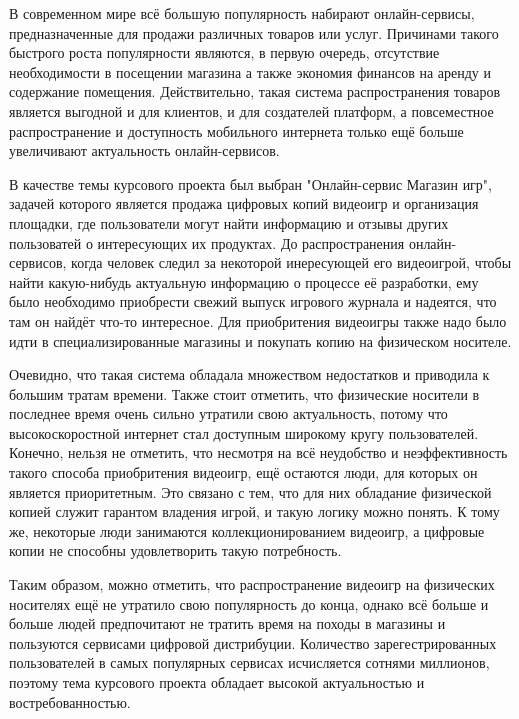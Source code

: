 \label{sec:introduction}

В современном мире всё большую популярность набирают онлайн-сервисы, предназначенные для продажи различных товаров или услуг.
Причинами такого быстрого роста популярности являются, в первую очередь, отсутствие необходимости в посещении магазина а также
экономия финансов на аренду и содержание помещения. Действительно, такая система распространения товаров является выгодной и для клиентов,
и для создателей платформ, а повсеместное распространение и доступность мобильного интернета только ещё больше увеличивают 
актуальность онлайн-сервисов.

В качестве темы курсового проекта был выбран "Онлайн-сервис Магазин игр", задачей которого является продажа цифровых копий видеоигр и
организация площадки, где пользователи могут найти информацию и отзывы других пользоватей о интересующих их продуктах. До распространения
онлайн-сервисов, когда человек следил за некоторой инересующей его видеоигрой, чтобы найти какую-нибудь актуальную информацию о процессе
её разработки, ему было необходимо приобрести свежий выпуск игрового журнала и надеятся, что там он найдёт что-то интересное. Для 
приобритения видеоигры также надо было идти в специализированные магазины и покупать копию на физическом носителе.

Очевидно, что такая система обладала множеством недостатков и приводила к большим тратам времени. Также стоит отметить, что физические
носители в последнее время очень сильно утратили свою актуальность, потому что высокоскоростной интернет стал доступным широкому кругу
пользователей. Конечно, нельзя не отметить, что несмотря на всё неудобство и неэффективность такого способа приобритения видеоигр, ещё
остаются люди, для которых он является приоритетным. Это связано с тем, что для них обладание физической копией служит гарантом владения
игрой, и такую логику можно понять. К тому же, некоторые люди занимаются коллекционированием видеоигр, а цифровые копии не способны
удовлетворить такую потребность.

Таким образом, можно отметить, что распространение видеоигр на физических носителях ещё не утратило свою популярность до конца, однако
всё больше и больше людей предпочитают не тратить время на походы в магазины и пользуются сервисами цифровой дистрибуции. Количество
зарегестрированных пользователей в самых популярных сервисах исчисляется сотнями миллионов, поэтому тема курсового проекта обладает
высокой актуальностью и востребованностью.